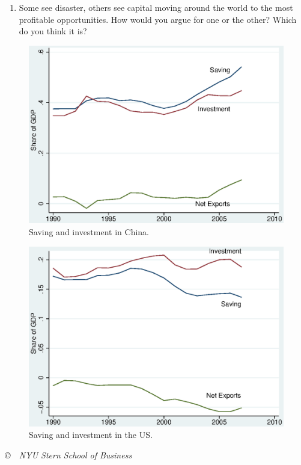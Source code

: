 \documentclass[letterpaper,12pt]{article}
\begin{document}
\begin{enumerate}
\begin{enumerate}
\item  
Some see disaster, others see capital moving around the world
to the most profitable opportunities.
How would you argue for one or the other?  
Which do you think it is?  

\end{enumerate}

\begin{figure}
    \centering
    \includegraphics[scale=0.8]{shares_china.eps}
    \caption{Saving and investment in China.}
    \label{fig:chn}%
\end{figure}

\begin{figure}
    \centering
    \includegraphics[scale=0.8]{shares_us.eps}
    \caption{Saving and investment in the US.}
    \label{fig:us}%
\end{figure}


\end{enumerate}


\vfill \centerline{\it \copyright \ \number\year \ 
NYU Stern School of Business}
\end{document}
